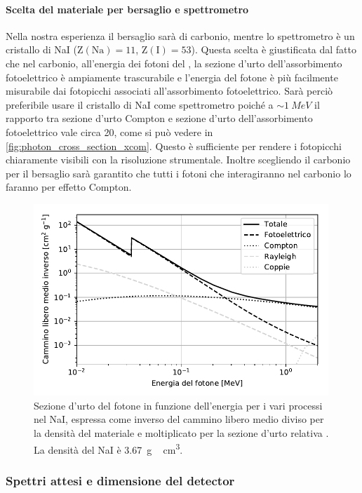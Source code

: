  \paragraph{Scelta del materiale per bersaglio e spettrometro}
 Nella nostra esperienza il bersaglio sarà di carbonio, mentre lo spettrometro è un cristallo di NaI ($\text{Z}(\text{Na})=11$, $\text{Z}(\text{I})=53$). Questa scelta è giustificata dal fatto che nel carbonio, all'energia dei fotoni del \co{}, la sezione d'urto dell'assorbimento fotoelettrico è ampiamente trascurabile e l'energia del fotone è più facilmente misurabile dai fotopicchi associati all'assorbimento fotoelettrico. Sarà perciò preferibile usare il cristallo di NaI come spettrometro poiché a $\sim\SI{1}{MeV}$ il rapporto tra sezione d'urto Compton e sezione d'urto dell'assorbimento fotoelettrico vale circa 20, come si può vedere in \autoref{fig:photon_cross_section_xcom}. Questo è sufficiente per rendere i fotopicchi chiaramente visibili con la risoluzione strumentale. Inoltre scegliendo il carbonio per il bersaglio  sarà garantito che tutti i fotoni che interagiranno nel carbonio lo faranno per effetto Compton.
  
  \begin{figure}[h]
 	\centering
 	\includegraphics[width=30em]{cross}
 	\caption{\label{fig:photon_cross_section_xcom}
	Sezione d'urto del fotone in funzione dell'energia per i vari processi nel NaI,
	espressa come inverso del cammino libero medio diviso per la densità del materiale
	e moltiplicato per la sezione d'urto relativa \cite{5}. La densità del NaI è \SI{3.67}{g\,cm^3}.}
 \end{figure}
 \subsubsection{Spettri attesi e dimensione del detector}
